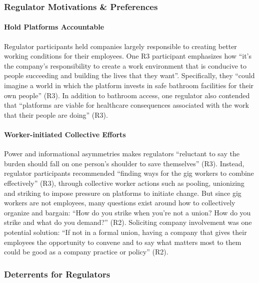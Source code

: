 \subsubsection{Regulator Motivations \& Preferences}
\paragraph{Hold Platforms Accountable}
Regulator participants held companies largely responsible to creating better working conditions for their employees. One R3 participant emphasizes how ``it's the company's responsibility to create a work environment that is conducive to people succeeding and building the lives that they want''. Specifically, they ``could imagine a world in which the platform invests in safe bathroom facilities for their own people'' (R3). In addition to bathroom access, one regulator also contended that ``platforms are viable for healthcare consequences associated with the work that their people are doing'' (R3).

\paragraph{Worker-initiated Collective Efforts} \label{worker_action}
Power and informational asymmetries makes regulators ``reluctant to say the burden should fall on one person's shoulder to save themselves'' (R3). Instead, regulator participants recommended ``finding ways for the gig workers to combine effectively'' (R3), through collective worker actions such as pooling, unionizing and striking to impose pressure on platforms to initiate change. 
But since gig workers are not employees, many questions exist around how to collectively organize and bargain: ``How do you strike when you're not a union? How do you strike and what do you demand?'' (R2). 
Soliciting company involvement was one potential solution: ``If not in a formal union, having a company that gives their employees the opportunity to convene and to say what matters most to them could be good as a company practice or policy'' (R2).

\subsubsection{Deterrents for Regulators}
